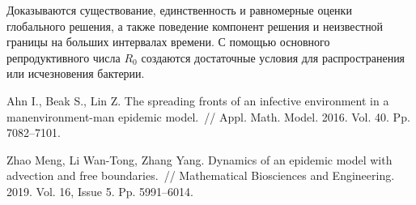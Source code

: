 Доказываются существование, единственность и равномерные оценки глобального решения, а также поведение компонент решения и неизвестной границы на больших интервалах времени. С помощью основного репродуктивного числа $R_{0}$ создаются достаточные условия для распространения или исчезновения бактерии.


%



\begin{thebibliography}{9} %
 Ahn I., Beak S.,   Lin Z. The spreading fronts of an infective environment in a manenvironment-man epidemic model.~// Appl. Math. Model. 2016. Vol. 40. Pp. 7082--7101.

 Zhao Meng, Li Wan-Tong, Zhang Yang. Dynamics of an epidemic model with advection and free boundaries.~// Mathematical Biosciences and Engineering. 2019. Vol. 16, Issue 5. Pp. 5991--6014.%

\end{thebibliography}





%

